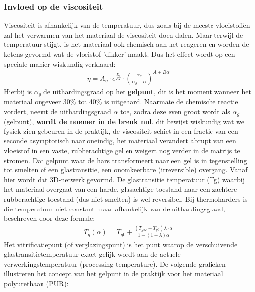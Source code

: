 \subsubsection{Invloed op de viscositeit}
Viscositeit is afhankelijk van de temperatuur, dus zoals bij de meeste vloeistoffen zal het verwarmen van het materiaal de viscositeit doen dalen. Maar terwijl de temperatuur stijgt, is het materiaal ook chemisch aan het reageren en worden de ketens gevormd wat de vloeistof 'dikker' maakt. Dus het effect wordt op een speciale manier wiskundig verklaard:
\begin{align*}
  \eta = A_{\eta}\cdot e^{\frac{E_{a}}{RT}} \cdot (\frac{\alpha_{g}}{\alpha_{g}-\alpha})^{A+B\alpha}
\end{align*}
Hierbij is $\alpha_{g}$ de uithardingsgraad op het \textbf{gelpunt}, dit is het moment wanneer het materiaal ongeveer 30\% tot 40\% is uitgehard. Naarmate de chemische reactie vordert, neemt de uithardingsgraad $\alpha$ toe, zodra deze even groot wordt als $\alpha_{g}$ (gelpunt),\textbf{ wordt de noemer in de breuk nul}, dit bewijst wiskundig wat we fysiek zien gebeuren in de praktijk, de viscositeit schiet in een fractie van een seconde asymptotisch naar oneindig, het materiaal verandert abrupt van een vloeistof in een vaste, rubberachtige gel en weigert nog verder in de matrijs te stromen.
\newline
\newline
Dat gelpunt waar de hars transformeert naar een gel is in tegenstelling tot smelten of een glastransitie, een onomkeerbare (irreversible) overgang. Vanaf hier wordt dat 3D-netwerk gevormd.
\newline
\newline
De glastransitie temperatuur (Tg) waarbij het materiaal overgaat van een harde, glasachtige toestand naar een zachtere rubberachtige toestand (dus niet smelten) is wel reversibel. Bij thermoharders is die temperatuur niet constant maar afhankelijk van de uithardingsgraad, beschreven door deze formule:
\begin{align*}
 T_{g}(\alpha) = T_{g0} + \frac{(T_{g\infty} - T_{g0})\lambda \cdot \alpha}{1-(1-\lambda)\alpha}
\end{align*}
Het vitrificatiepunt (of verglazingspunt) is het punt waarop de verschuivende glastransitietemperatuur exact gelijk wordt aan de actuele verwerkingstemperatuur (processing temperature).
\newline
\newline
De volgende grafieken illustreren het concept van het gelpunt in de praktijk voor het materiaal polyurethaan (PUR):
